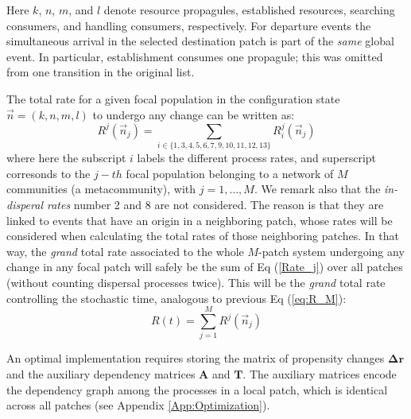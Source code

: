 \noindent Here $k$, $n$, $m$, and $l$ denote resource propagules, established resources, searching consumers, and handling consumers, respectively. For departure events the simultaneous arrival in the selected destination patch is part of the \emph{same} global event. In particular, establishment consumes one propagule; this was omitted from one transition in the original list.
  
The total rate for a given focal population in the configuration state $\vec{n}=(k,n,m,l)$ to undergo any change can be written as: 
\begin{equation}
R^j(\vec{n}_j) = \sum_{i\in\{1,3,4,5,6,7,9,10,11,12,13\}} R^j_i(\vec{n}_j)
\label{Rate_j}
\end{equation}
where here the subscript $i$ labels the different process rates, and superscript corresonds to the $j-th$ focal population belonging to a network of $M$ communities (a metacommunity), with $j=1, \dots, M$. We remark also that the {\em in-disperal rates} number 2 and 8 are not considered. The reason is that they are linked to events that have an origin in a neighboring patch, whose rates will be considered when calculating the total rates of those neighboring patches. In that way,  the {\em grand} total rate associated to the whole $M$-patch system undergoing any change in any focal patch will safely be the sum of Eq (\ref{Rate_j}) over all patches (without counting dispersal processes twice). This will be the {\em grand} total rate controlling the stochastic time, analogous to previous Eq (\ref{eq:R_M}):
\begin{equation}
  R(t) =  \sum_{j=1}^{M} R^j(\vec{n}_j)
  \label{eq:RD_M}
\end{equation}  
 
An optimal implementation requires storing the matrix of propensity changes $\mathbf{\Delta r}$ and the auxiliary dependency matrices $\mathbf A$ and $\mathbf T$. The auxiliary matrices encode the dependency graph among the processes in a local patch, which is identical across all patches (see Appendix \ref{App:Optimization}).

